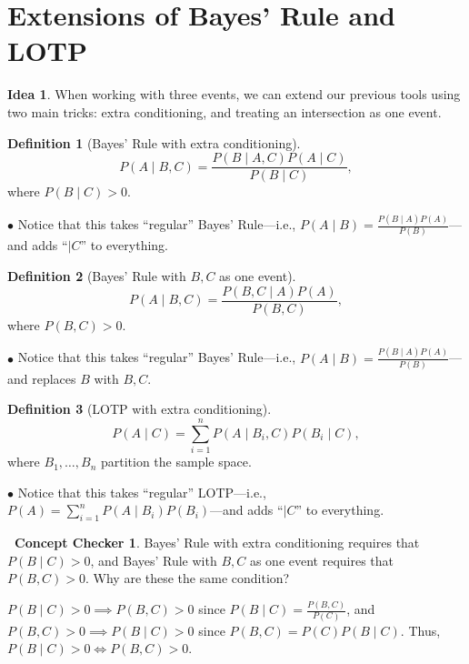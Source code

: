 \documentclass[12pt,oneside]{article}
\theoremstyle{definition}
\newtheorem{definition}{Definition}
\newtheorem{concept}{\faPen \ Concept Checker}
\newtheorem*{idea}{Idea}
\theoremstyle{remark}
\begin{document}
\section{Extensions of Bayes' Rule and LOTP}

\begin{idea}
When working with three events, we can extend our previous tools using two main tricks: extra conditioning, and treating an intersection as one event.
\end{idea}

\begin{definition}[Bayes' Rule with extra conditioning]
\[P(A \mid B, C) = \frac{P(B \mid A, C) P(A \mid C)}{P(B \mid C)},\] where $P(B \mid C) > 0$.

$\bullet$ Notice that this takes \enquote{regular} Bayes' Rule—i.e., $P(A \mid B) = \frac{P(B \mid A) P(A)}{P(B)}$—and adds \enquote{$\mid C$} to everything.
\end{definition}

\begin{definition}[Bayes' Rule with $B, C$ as one event]
\[P(A \mid B, C) = \frac{P(B, C \mid A) P(A)}{P(B, C)},\] where $P(B, C) > 0$.

$\bullet$ Notice that this takes \enquote{regular} Bayes' Rule—i.e., $P(A \mid B) = \frac{P(B \mid A) P(A)}{P(B)}$—and replaces $B$ with $B, C$.
\end{definition}

\begin{definition}[LOTP with extra conditioning]
\[P(A \mid C) = \sum_{i = 1}^{n} P(A \mid B_i, C) P(B_i \mid C),\] where $B_1, \ldots, B_n$ partition the sample space.

$\bullet$ Notice that this takes \enquote{regular} LOTP—i.e., $P(A) = \sum_{i = 1}^{n} P(A \mid B_i) P(B_i)$—and adds \enquote{$\mid C$} to everything.
\end{definition}

\begin{concept}
Bayes' Rule with extra conditioning requires that $P(B \mid C) > 0$, and Bayes' Rule with $B, C$ as one event requires that $P(B, C) > 0$. Why are these the same condition?
\end{concept}

\begin{solutionbox}
$P(B \mid C) > 0 \implies P(B, C) > 0$ since $P(B \mid C) = \frac{P(B, C)}{P(C)}$, and $P(B, C) > 0 \implies P(B \mid C) > 0$ since $P(B, C) = P(C) P(B \mid C)$. Thus, $P(B \mid C) > 0 \iff P(B, C) > 0$.
\end{solutionbox}
\end{document}
